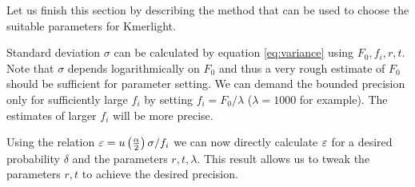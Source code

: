 \medskip

Let us finish this section by describing the method that can be used to choose the suitable parameters for Kmerlight.

Standard deviation $\sigma$ can be calculated by equation \ref{eq:variance} using $F_0, f_i, r, t$. 
Note that $\sigma$ depends logarithmically on $F_0$ and thus a very rough estimate of $F_0$ should
be sufficient for parameter setting. We can demand the bounded precision only for sufficiently large $f_i$ by setting 
$f_i = F_0/\lambda$ ($\lambda=1000$ for example). The estimates of larger $f_i$ will be more precise.

Using the relation $\varepsilon = u\left(\frac{\alpha}{2}\right)\sigma/f_i$ we can now directly calculate $\varepsilon$
for a desired probability $\delta$ and the parameters $r, t, \lambda$. This result allows us to tweak
the parameters $r, t$ to achieve the desired precision.
